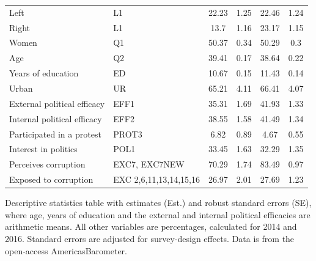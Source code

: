 \documentclass[12pt,a4]{article}\usepackage[]{graphicx}\usepackage[]{xcolor}
\begin{document}
\begin{table}[htbp!]
\begin{center}
\begin{tabular}{llcccc}
Left                                          & L1                                                                                      & 22.23    & 1.25           & 22.46    & 1.24           \\
Right                                         & L1                                                                                      & 13.7     & 1.16           & 23.17    & 1.15           \\
Women                                         & Q1                                                                                      & 50.37    & 0.34           & 50.29    & 0.3            \\
Age                                           & Q2                                                                                      & 39.41    & 0.17           & 38.64    & 0.22           \\
Years of education                            & ED                                                                                      & 10.67    & 0.15           & 11.43    & 0.14           \\
Urban                                         & UR                                                                                      & 65.21    & 4.11           & 66.41    & 4.07           \\
External political efficacy                   & EFF1                                                                                    & 35.31    & 1.69           & 41.93    & 1.33           \\
Internal political efficacy                   & EFF2                                                                                    & 38.55    & 1.58           & 41.49    & 1.34           \\
Participated in a protest                     & PROT3                                                                                   & 6.82     & 0.89           & 4.67     & 0.55           \\
Interest in politics & POL1 & 33.45 & 1.63 & 32.29 & 1.35 \\
Perceives corruption                          & EXC7, EXC7NEW                                                                           & 70.29    & 1.74           & 83.49    & 0.97           \\
Exposed to corruption                         & EXC 2,6,11,13,14,15,16                                                                  & 26.97    & 2.01           & 27.69    & 1.23           \\ 
\bottomrule
\end{tabular}
\end{center}
Descriptive statistics table with estimates (Est.) and robust standard errors (SE), where age, years of education and the external and internal political efficacies are arithmetic means. All other variables are percentages, calculated for 2014 and 2016. Standard errors are adjusted for survey-design effects. Data is from the open-access AmericasBarometer.
\end{table}
\end{document}
